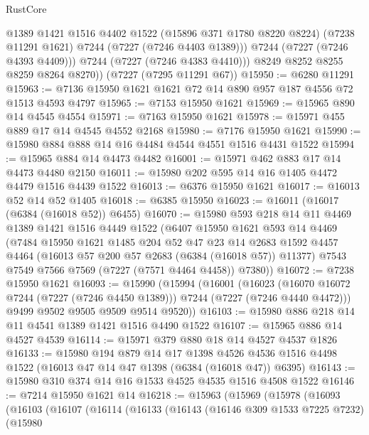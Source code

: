 \begin{lexlean}{RustCore}
\begin{coremodule}
              @1389
              @1421
              @1516
              @4402
              @1522
              (@15896 @371 @1780 @8220 @8224)
              (@7238 @11291 @1621)
              @7244
              (@7227 (@7246 @4403 @1389)))
            @7244
            (@7227 (@7246 @4393 @4409)))
          @7244
          (@7227 (@7246 @4383 @4410)))
        @8249
        @8252
        @8255
        @8259
        @8264
        @8270))
    (@7227 (@7295 @11291 @67))
@15950 := @6280 @11291
@15963 := @7136 @15950 @1621 @1621 @72 @14 @890 @957 @187 @4556 @72 @1513 @4593 @4797
@15965 := @7153 @15950 @1621
@15969 := @15965 @890 @14 @4545 @4554
@15971 := @7163 @15950 @1621
@15978 := @15971 @455 @889 @17 @14 @4545 @4552 @2168
@15980 := @7176 @15950 @1621
@15990 := @15980 @884 @888 @14 @16 @4484 @4544 @4551 @1516 @4431 @1522
@15994 := @15965 @884 @14 @4473 @4482
@16001 := @15971 @462 @883 @17 @14 @4473 @4480 @2150
@16011 := @15980 @202 @595 @14 @16 @1405 @4472 @4479 @1516 @4439 @1522
@16013 := @6376 @15950 @1621
@16017 := @16013 @52 @14 @52 @1405
@16018 := @6385 @15950
@16023 := @16011 (@16017 (@6384 (@16018 @52)) @6455)
@16070 := @15980
    @593
    @218
    @14
    @11
    @4469
    @1389
    @1421
    @1516
    @4449
    @1522
    (@6407
      @15950
      @1621
      @593
      @14
      @4469
      (@7484
        @15950
        @1621
        @1485
        @204
        @52
        @47
        @23
        @14
        @2683
        @1592
        @4457
        @4464
        (@16013 @57 @200 @57 @2683 (@6384 (@16018 @57)) @11377)
        @7543
        @7549
        @7566
        @7569
        (@7227 (@7571 @4464 @4458))
        @7380))
@16072 := @7238 @15950 @1621
@16093 := @15990
    (@15994
      (@16001
        (@16023 (@16070 @16072 @7244 (@7227 (@7246 @4450 @1389))) @7244 (@7227 (@7246 @4440 @4472)))
        @9499
        @9502
        @9505
        @9509
        @9514
        @9520))
@16103 := @15980 @886 @218 @14 @11 @4541 @1389 @1421 @1516 @4490 @1522
@16107 := @15965 @886 @14 @4527 @4539
@16114 := @15971 @379 @880 @18 @14 @4527 @4537 @1826
@16133 := @15980
    @194
    @879
    @14
    @17
    @1398
    @4526
    @4536
    @1516
    @4498
    @1522
    (@16013 @47 @14 @47 @1398 (@6384 (@16018 @47)) @6395)
@16143 := @15980 @310 @374 @14 @16 @1533 @4525 @4535 @1516 @4508 @1522
@16146 := @7214 @15950 @1621 @14
@16218 := @15963
    (@15969
      (@15978
        (@16093
          (@16103
            (@16107
              (@16114
                (@16133
                  (@16143
                    (@16146 @309 @1533 @7225 @7232)
                    (@15980

\end{coremodule}
\end{lexlean}
